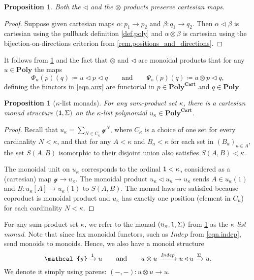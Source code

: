\documentclass[11pt, one side, article]{memoir}
\theoremstyle{definition}
\theoremstyle{plain}
\newtheorem{proposition}[definitionx]{Proposition}
\newenvironment{definition}
  {\pushQED{\qed}\renewcommand{\qedsymbol}{$\lozenge$}\definitionx}
  {\popQED\enddefinitionx}
\newcommand{\Cat}[1]{\mathbf{#1}}%
\newcommand{\Fun}[1]{\mathit{#1}}%
\newcommand{\To}[2][]{\xrightarrow[#1]{#2}}
\newcommand{\yon}{\mathcal{y}}
\newcommand{\poly}{\Cat{Poly}}
\newcommand{\polycart}{\poly^{\Cat{Cart}}}
\newcommand{\0}{\textsf{0}}
\newcommand{\1}{\tn{\textsf{1}}}
\newcommand{\tri}{\mathbin{\triangleleft}}
\newcommand{\indep}{\Fun{Indep}}
\newcommand{\qqand}{\qquad\text{and}\qquad}
\begin{document}
\begin{proposition}\label{prop.tri_dir_cartesian}
Both the $\tri$ and the $\otimes$ products preserve cartesian maps.
\end{proposition}
\begin{proof}
Suppose given cartesian maps $\alpha\colon p_1\to p_2$ and $\beta\colon q_1\to q_2$. Then $\alpha\tri\beta$ is cartesian using the pullback definition \cref{def.poly} and $\alpha\otimes\beta$ is cartesian using the bijection-on-directions criterion from \cref{rem.positions_and_directions}.
\end{proof}

It follows from \cref{prop.tri_dir_cartesian} and the fact that $\otimes$ and $\tri$ are monoidal products that for any $u\in\poly$ the maps
\[
	\Phi_u(p)(q)\coloneqq u\tri p\tri q
	\qqand
	\Psi_u(p)(q)\coloneqq u\otimes p\tri q,
\]
defining the functors in \eqref{eqn.aux} are functorial in $p\in\polycart$ and $q\in\poly$.

\begin{proposition}[$\kappa$-list monads]\label{prop.list_monad}
For any sum-product set $\kappa$, there is a cartesian monad structure $(\1,\Sigma)$ on the $\kappa$-list polynomial $u_\kappa\in\polycart$.
\end{proposition}
\begin{proof}
Recall that $u_\kappa=\sum_{N\in C_\kappa}\yon^N$, where $C_\kappa$ is a choice of one set for every cardinality $N<\kappa$, and that for any $A<\kappa$ and $B_a<\kappa$ for each set in $(B_a)_{a\in A}$, the set $S(A,B)$ isomorphic to their disjoint union also satisfies $S(A,B)<\kappa$. 

The monoidal unit on $u_\kappa$ corresponds to the ordinal $\1<\kappa$, considered as a (cartesian) map $\yon\to u_\kappa$. The monoidal product $u_\kappa\tri u_\kappa\to u_\kappa$ sends $A\in u_\kappa(1)$ and $B\colon u_\kappa[A]\to u_\kappa(1)$ to $S(A,B)$. The monad laws are satisfied because coproduct is monoidal product and $u_\kappa$ has exactly one position (element in $C_\kappa$) for each cardinality $N<\kappa$. 
\end{proof}

\begin{definition}[$\kappa$-list monads]
For any sum-product set $\kappa$, we refer to the monad $(u_\kappa,\1,\Sigma)$ from \cref{prop.list_monad} as the \emph{$\kappa$-list monad}. Note that since lax monoidal functors, such as $\indep$ from \eqref{eqn.indep}, send monoids to monoids. Hence, we also have a monoid structure 
\begin{equation}\label{eqn.otimes_monoid}
	\yon\To{\1} u
	\qqand
	u\otimes u\To{\indep} u\tri u\To{\Sigma}u.
\end{equation}
We denote it simply using parens: $(-,-)\colon u\otimes u\to u$.
\end{definition}
\end{document}
